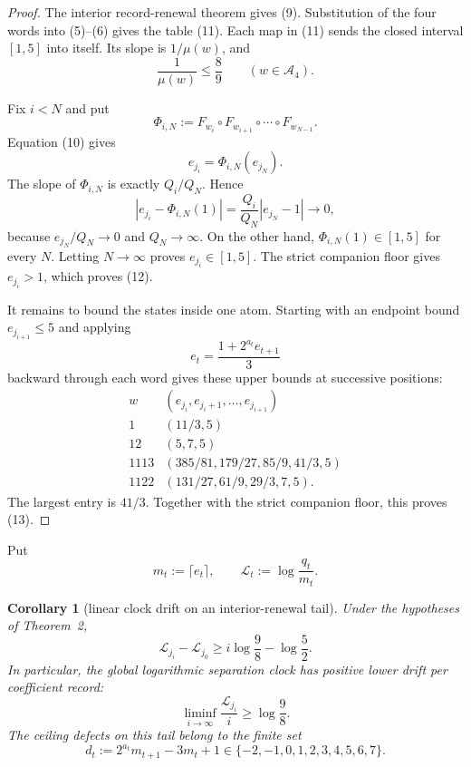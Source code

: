 \documentclass[11pt]{article}
\newtheorem{corollary}[theorem]{Corollary}
\begin{document}
\begin{proof}
The interior record-renewal theorem gives (9).  Substitution of the four
words into (5)--(6) gives the table (11).  Each map in (11) sends the
closed interval $[1,5]$ into itself.  Its slope is $1/\mu(w)$, and
\[
  \frac1{\mu(w)}\leq\frac89
  \qquad(w\in\mathcal A_4).
  \tag{14}
\]

Fix $i<N$ and put
\[
  \Phi_{i,N}:=F_{w_i}\circ F_{w_{i+1}}\circ\cdots
                    \circ F_{w_{N-1}}.
\]
Equation (10) gives
\[
  e_{j_i}=\Phi_{i,N}(e_{j_N}).
  \tag{15}
\]
The slope of $\Phi_{i,N}$ is exactly $Q_i/Q_N$.  Hence
\[
  \left|e_{j_i}-\Phi_{i,N}(1)\right|
  =\frac{Q_i}{Q_N}|e_{j_N}-1|
  \longrightarrow0,
  \tag{16}
\]
because $e_{j_N}/Q_N\to0$ and $Q_N\to\infty$.  On the other hand,
$\Phi_{i,N}(1)\in[1,5]$ for every $N$.  Letting $N\to\infty$ proves
$e_{j_i}\in[1,5]$.  The strict companion floor gives $e_{j_i}>1$, which
proves (12).

It remains to bound the states inside one atom.  Starting with an endpoint
bound $e_{j_{i+1}}\leq5$ and applying
\[
  e_t=\frac{1+2^{a_t}e_{t+1}}3
  \tag{17}
\]
backward through each word gives these upper bounds at successive positions:
\[
\begin{array}{c|c}
  w& (e_{j_i},e_{j_i+1},\ldots,e_{j_{i+1}})\\ \hline
  1&(11/3,5)\\[1mm]
  12&(5,7,5)\\[1mm]
  1113&(385/81,179/27,85/9,41/3,5)\\[1mm]
  1122&(131/27,61/9,29/3,7,5).
\end{array}
\tag{18}
\]
The largest entry is $41/3$.  Together with the strict companion floor,
this proves (13).
\end{proof}

Put
\[
  m_t:=\lceil e_t\rceil,
  \qquad
  \mathcal L_t:=\log\frac{q_t}{m_t}.
  \tag{19}
\]

\begin{corollary}[linear clock drift on an interior-renewal tail]
Under the hypotheses of Theorem~2,
\[
  \boxed{
  \mathcal L_{j_i}-\mathcal L_{j_0}
  \geq i\log\frac98-\log\frac52.}
  \tag{20}
\]
In particular, the global logarithmic separation clock has positive lower
drift per coefficient record:
\[
  \liminf_{i\to\infty}
  \frac{\mathcal L_{j_i}}{i}
  \geq\log\frac98.
  \tag{21}
\]
The ceiling defects on this tail belong to the finite set
\[
  d_t:=2^{a_t}m_{t+1}-3m_t+1
  \in\{-2,-1,0,1,2,3,4,5,6,7\}.
  \tag{22}
\]
\end{corollary}
\end{document}
